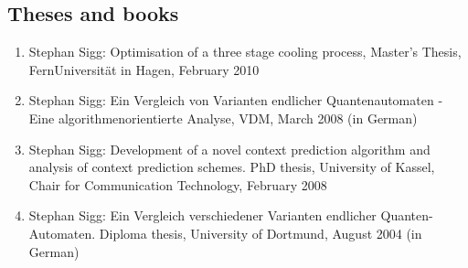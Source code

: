\documentclass[10pt]{article}
\newcounter{saveenumi}
\begin{document}
\subsection*{Theses and books}
\begin{enumerate}
\setcounter{enumi}{\value{saveenumi}}
\item Stephan Sigg: Optimisation of a three stage cooling process, Master's Thesis, FernUniversität in Hagen, February 2010
\item Stephan Sigg: Ein Vergleich von Varianten endlicher Quantenautomaten - Eine algorithmenorientierte Analyse, VDM, March 2008 (in German)
\item Stephan Sigg: Development of a novel context prediction algorithm and analysis of context prediction schemes. PhD thesis, University of Kassel, Chair for Communication Technology, February 2008
\item Stephan Sigg: Ein Vergleich verschiedener Varianten endlicher Quanten-Automaten. Diploma thesis, University of Dortmund, August 2004 (in German)
\end{enumerate}

\label{MaxSeitenzahl}
\end{document}
